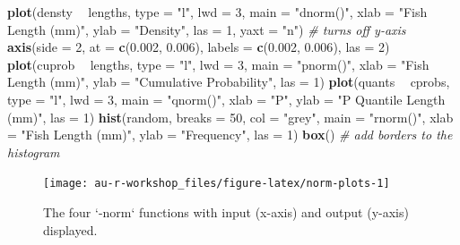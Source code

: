 \documentclass[]{book}
\newenvironment{Shaded}{\begin{snugshade}}{\end{snugshade}}
\newcommand{\KeywordTok}[1]{\textcolor[rgb]{0.13,0.29,0.53}{\textbf{#1}}}
\newcommand{\DataTypeTok}[1]{\textcolor[rgb]{0.13,0.29,0.53}{#1}}
\newcommand{\DecValTok}[1]{\textcolor[rgb]{0.00,0.00,0.81}{#1}}
\newcommand{\FloatTok}[1]{\textcolor[rgb]{0.00,0.00,0.81}{#1}}
\newcommand{\StringTok}[1]{\textcolor[rgb]{0.31,0.60,0.02}{#1}}
\newcommand{\CommentTok}[1]{\textcolor[rgb]{0.56,0.35,0.01}{\textit{#1}}}
\newcommand{\OperatorTok}[1]{\textcolor[rgb]{0.81,0.36,0.00}{\textbf{#1}}}
\newcommand{\NormalTok}[1]{#1}
\theoremstyle{definition}
\theoremstyle{definition}
\theoremstyle{definition}
\theoremstyle{remark}
\begin{document}
\begin{Shaded}
\begin{Highlighting}[]
\KeywordTok{plot}\NormalTok{(densty }\OperatorTok{~}\StringTok{ }\NormalTok{lengths, }\DataTypeTok{type =} \StringTok{"l"}\NormalTok{, }\DataTypeTok{lwd =} \DecValTok{3}\NormalTok{, }\DataTypeTok{main =} \StringTok{"dnorm()"}\NormalTok{,}
     \DataTypeTok{xlab =} \StringTok{"Fish Length (mm)"}\NormalTok{, }\DataTypeTok{ylab =} \StringTok{"Density"}\NormalTok{, }\DataTypeTok{las =} \DecValTok{1}\NormalTok{,}
     \DataTypeTok{yaxt =} \StringTok{"n"}\NormalTok{) }\CommentTok{# turns off y-axis}
\KeywordTok{axis}\NormalTok{(}\DataTypeTok{side =} \DecValTok{2}\NormalTok{, }\DataTypeTok{at =} \KeywordTok{c}\NormalTok{(}\FloatTok{0.002}\NormalTok{, }\FloatTok{0.006}\NormalTok{), }\DataTypeTok{labels =} \KeywordTok{c}\NormalTok{(}\FloatTok{0.002}\NormalTok{, }\FloatTok{0.006}\NormalTok{), }\DataTypeTok{las =} \DecValTok{2}\NormalTok{)}
\KeywordTok{plot}\NormalTok{(cuprob }\OperatorTok{~}\StringTok{ }\NormalTok{lengths, }\DataTypeTok{type =} \StringTok{"l"}\NormalTok{, }\DataTypeTok{lwd =} \DecValTok{3}\NormalTok{, }\DataTypeTok{main =} \StringTok{"pnorm()"}\NormalTok{,}
     \DataTypeTok{xlab =} \StringTok{"Fish Length (mm)"}\NormalTok{, }\DataTypeTok{ylab =} \StringTok{"Cumulative Probability"}\NormalTok{, }\DataTypeTok{las =} \DecValTok{1}\NormalTok{)}
\KeywordTok{plot}\NormalTok{(quants }\OperatorTok{~}\StringTok{ }\NormalTok{cprobs, }\DataTypeTok{type =} \StringTok{"l"}\NormalTok{, }\DataTypeTok{lwd =} \DecValTok{3}\NormalTok{, }\DataTypeTok{main =} \StringTok{"qnorm()"}\NormalTok{,}
     \DataTypeTok{xlab =} \StringTok{"P"}\NormalTok{, }\DataTypeTok{ylab =} \StringTok{"P Quantile Length (mm)"}\NormalTok{, }\DataTypeTok{las =} \DecValTok{1}\NormalTok{)}
\KeywordTok{hist}\NormalTok{(random, }\DataTypeTok{breaks =} \DecValTok{50}\NormalTok{, }\DataTypeTok{col =} \StringTok{"grey"}\NormalTok{, }\DataTypeTok{main =} \StringTok{"rnorm()"}\NormalTok{,}
     \DataTypeTok{xlab =} \StringTok{"Fish Length (mm)"}\NormalTok{, }\DataTypeTok{ylab =} \StringTok{"Frequency"}\NormalTok{, }\DataTypeTok{las =} \DecValTok{1}\NormalTok{)}
\KeywordTok{box}\NormalTok{() }\CommentTok{# add borders to the histogram}
\end{Highlighting}
\end{Shaded}

\begin{figure}

{\centering \texttt{[image: au-r-workshop\_files/figure-latex/norm-plots-1]} 

}

\caption{The four `-norm` functions with input (x-axis) and output (y-axis) displayed.}\label{fig:norm-plots}
\end{figure}
\end{document}
